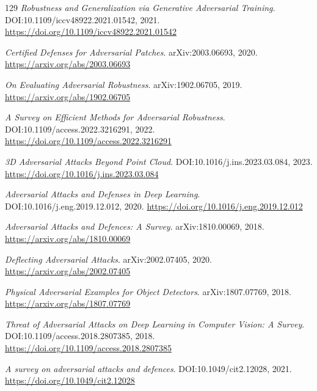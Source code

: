 \documentclass[11pt,a4paper]{article}
\begin{document}
\begin{thebibliography}{129}
\newblock \emph{Robustness and Generalization via Generative Adversarial Training}.
\newblock DOI:10.1109/iccv48922.2021.01542, 2021.
\newblock \url{https://doi.org/10.1109/iccv48922.2021.01542}

\newblock \emph{Certified Defenses for Adversarial Patches}.
\newblock arXiv:2003.06693, 2020.
\newblock \url{https://arxiv.org/abs/2003.06693}

\newblock \emph{On Evaluating Adversarial Robustness}.
\newblock arXiv:1902.06705, 2019.
\newblock \url{https://arxiv.org/abs/1902.06705}

\newblock \emph{A Survey on Efficient Methods for Adversarial Robustness}.
\newblock DOI:10.1109/access.2022.3216291, 2022.
\newblock \url{https://doi.org/10.1109/access.2022.3216291}

\newblock \emph{3D Adversarial Attacks Beyond Point Cloud}.
\newblock DOI:10.1016/j.ins.2023.03.084, 2023.
\newblock \url{https://doi.org/10.1016/j.ins.2023.03.084}

\newblock \emph{Adversarial Attacks and Defenses in Deep Learning}.
\newblock DOI:10.1016/j.eng.2019.12.012, 2020.
\newblock \url{https://doi.org/10.1016/j.eng.2019.12.012}

\newblock \emph{Adversarial Attacks and Defences: A Survey}.
\newblock arXiv:1810.00069, 2018.
\newblock \url{https://arxiv.org/abs/1810.00069}

\newblock \emph{Deflecting Adversarial Attacks}.
\newblock arXiv:2002.07405, 2020.
\newblock \url{https://arxiv.org/abs/2002.07405}

\newblock \emph{Physical Adversarial Examples for Object Detectors}.
\newblock arXiv:1807.07769, 2018.
\newblock \url{https://arxiv.org/abs/1807.07769}

\newblock \emph{Threat of Adversarial Attacks on Deep Learning in Computer Vision: A Survey}.
\newblock DOI:10.1109/access.2018.2807385, 2018.
\newblock \url{https://doi.org/10.1109/access.2018.2807385}

\newblock \emph{A survey on adversarial attacks and defences}.
\newblock DOI:10.1049/cit2.12028, 2021.
\newblock \url{https://doi.org/10.1049/cit2.12028}


\end{thebibliography}
\end{document}
